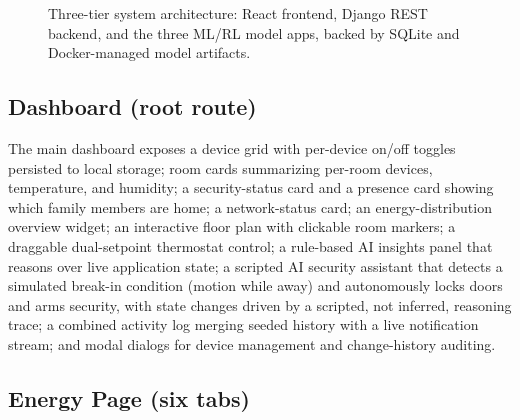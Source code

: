 \documentclass[11pt,a4paper]{article}
\begin{document}
\begin{figure}[htbp]
\centering
{}
\caption{Three-tier system architecture: React frontend, Django REST backend, and the three ML/RL model apps, backed by SQLite and Docker-managed model artifacts.}
\label{fig:architecture}
\end{figure}

\subsection{Dashboard (root route)}

The main dashboard exposes a device grid with per-device on/off toggles persisted to local storage; room cards summarizing per-room devices, temperature, and humidity; a security-status card and a presence card showing which family members are home; a network-status card; an energy-distribution overview widget; an interactive floor plan with clickable room markers; a draggable dual-setpoint thermostat control; a rule-based AI insights panel that reasons over live application state; a scripted AI security assistant that detects a simulated break-in condition (motion while away) and autonomously locks doors and arms security, with state changes driven by a scripted, not inferred, reasoning trace; a combined activity log merging seeded history with a live notification stream; and modal dialogs for device management and change-history auditing.

\subsection{Energy Page (six tabs)}
\end{document}
